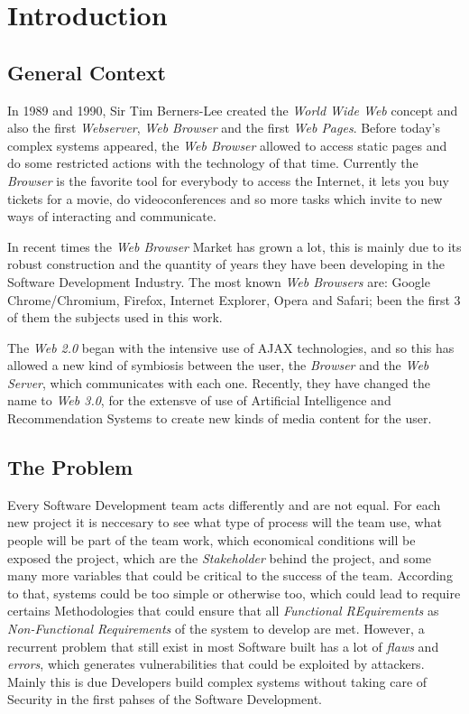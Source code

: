 


\chapter{Introduction}
\label{chap1:intro}

\section{General Context}
\label{chap1:CG}

In 1989 and 1990, Sir Tim Berners-Lee created the \textit{World Wide Web} concept and also the first \textit{Webserver}, \textit{Web Browser} and the first \textit{Web Pages}. Before today's complex systems appeared, the \textit{Web Browser} allowed to access static pages and do some restricted actions with the technology of that time. Currently the \textit{Browser} is the favorite tool for everybody to access the Internet,  it lets you buy tickets for a movie, do videoconferences and so more tasks which invite to new ways of interacting and communicate.

In recent times the \textit{Web Browser} Market has grown a lot, this is mainly due to its robust construction and the quantity of years they have been developing in the Software Development Industry. The most known \textit{Web Browsers} are: Google Chrome/Chromium, Firefox, Internet Explorer, Opera and Safari; been the first 3 of them the subjects used in this work.

The \textit{Web 2.0} began with the intensive use of AJAX technologies, and so this has allowed a new kind of symbiosis between the user, the \textit{Browser} and the \textit{Web Server}, which communicates with each one. Recently, they have changed the name to \textit{Web 3.0}, for the extensve of use of Artificial Intelligence and Recommendation Systems to create new kinds of media content for the user.


\section{The Problem}
\label{chap1:SD_SS}

Every Software Development team acts differently and are not equal.  For each new project it is neccesary to see what type of process will the team use, what people will be part of the team work, which economical conditions will be exposed the project, which are the \textit{Stakeholder} behind the project, and some many more variables that could be critical to the success of the team. According to that, systems could be too simple or otherwise too, which could lead to require certains Methodologies that could ensure that all \textit{Functional REquirements} as \textit{Non-Functional Requirements} of the system to develop are met. However, a recurrent problem that still exist in most Software built has a lot of \textit{flaws} and \textit{errors}, which generates vulnerabilities that could be exploited by attackers. Mainly this is due Developers build complex systems without taking care of Security in the first pahses of the Software Development.

